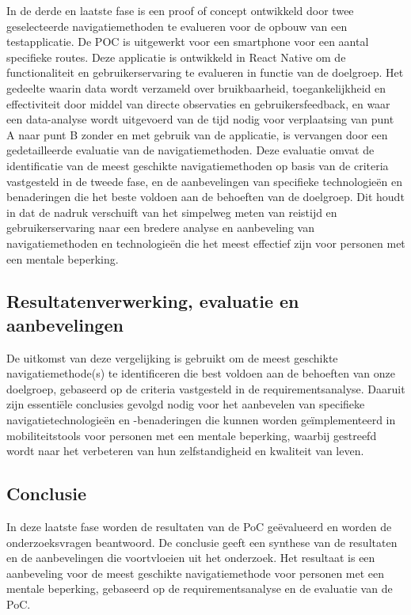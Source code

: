 In de derde en laatste fase is een proof of concept ontwikkeld door twee geselecteerde navigatiemethoden te evalueren voor de opbouw van een testapplicatie. De POC is uitgewerkt voor een smartphone voor een aantal specifieke routes. Deze applicatie is ontwikkeld in React Native om de functionaliteit en gebruikerservaring te evalueren in functie van de doelgroep. Het gedeelte waarin data wordt verzameld over bruikbaarheid, toegankelijkheid en effectiviteit door middel van directe observaties en gebruikersfeedback, en waar een data-analyse wordt uitgevoerd van de tijd nodig voor verplaatsing van punt A naar punt B zonder en met gebruik van de applicatie, is vervangen door een gedetailleerde evaluatie van de navigatiemethoden. Deze evaluatie omvat de identificatie van de meest geschikte navigatiemethoden op basis van de criteria vastgesteld in de tweede fase, en de aanbevelingen van specifieke technologieën en benaderingen die het beste voldoen aan de behoeften van de doelgroep. Dit houdt in dat de nadruk verschuift van het simpelweg meten van reistijd en gebruikerservaring naar een bredere analyse en aanbeveling van navigatiemethoden en technologieën die het meest effectief zijn voor personen met een mentale beperking.


\subsection*{Resultatenverwerking, evaluatie en aanbevelingen}

De uitkomst van deze vergelijking is gebruikt om de meest geschikte navigatiemethode(s) te identificeren die best voldoen aan de behoeften van onze doelgroep, gebaseerd op de criteria vastgesteld in de requirementsanalyse. Daaruit zijn essentiële conclusies gevolgd nodig voor het aanbevelen van specifieke navigatietechnologieën en -benaderingen die kunnen worden geïmplementeerd in mobiliteitstools voor personen met een mentale beperking, waarbij gestreefd wordt naar het verbeteren van hun zelfstandigheid en kwaliteit van leven.

\subsection*{Conclusie}

In deze laatste fase worden de resultaten van de PoC geëvalueerd en worden de onderzoeksvragen beantwoord. De conclusie geeft een synthese van de resultaten en de aanbevelingen die voortvloeien uit het onderzoek. Het resultaat is een aanbeveling voor de meest geschikte navigatiemethode voor personen met een mentale beperking, gebaseerd op de requirementsanalyse en de evaluatie van de PoC.